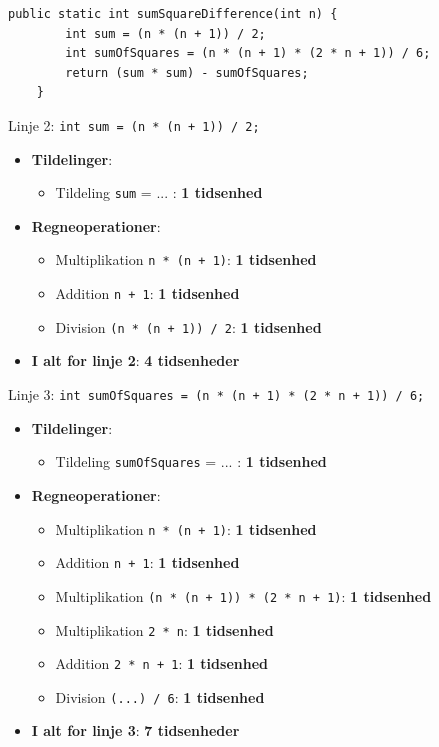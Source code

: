\begin{example}
    
    \begin{lstlisting}[style=javaStyle, caption={Simpel funktion}, label={lst:java_simple_function}]
    public static int sumSquareDifference(int n) {
        int sum = (n * (n + 1)) / 2;
        int sumOfSquares = (n * (n + 1) * (2 * n + 1)) / 6;
        return (sum * sum) - sumOfSquares;
    }
    \end{lstlisting}

    Linje 2: \texttt{int sum = (n * (n + 1)) / 2;}
    \begin{itemize}
        \item \textbf{Tildelinger}: 
            \begin{itemize}
                \item Tildeling \texttt{sum} = ... : \textbf{1 tidsenhed}
            \end{itemize}
        \item \textbf{Regneoperationer}: 
            \begin{itemize}
                \item Multiplikation \texttt{n * (n + 1)}: \textbf{1 tidsenhed}
                \item Addition \texttt{n + 1}: \textbf{1 tidsenhed}
                \item Division \texttt{(n * (n + 1)) / 2}: \textbf{1 tidsenhed}
            \end{itemize}
        \item \textbf{I alt for linje 2}: \textbf{4 tidsenheder}
    \end{itemize}

    Linje 3: \texttt{int sumOfSquares = (n * (n + 1) * (2 * n + 1)) / 6;}
    \begin{itemize}
        \item \textbf{Tildelinger}:
            \begin{itemize}
                \item Tildeling \texttt{sumOfSquares} = ... : \textbf{1 tidsenhed}
            \end{itemize}
        \item \textbf{Regneoperationer}: 
            \begin{itemize}
                \item Multiplikation \texttt{n * (n + 1)}: \textbf{1 tidsenhed}
                \item Addition \texttt{n + 1}: \textbf{1 tidsenhed}
                \item Multiplikation \texttt{(n * (n + 1)) * (2 * n + 1)}: \textbf{1 tidsenhed}
                \item Multiplikation \texttt{2 * n}: \textbf{1 tidsenhed}
                \item Addition \texttt{2 * n + 1}: \textbf{1 tidsenhed}
                \item Division \texttt{(...) / 6}: \textbf{1 tidsenhed}
            \end{itemize}
        \item \textbf{I alt for linje 3}: \textbf{7 tidsenheder}
    \end{itemize}


\end{example}
